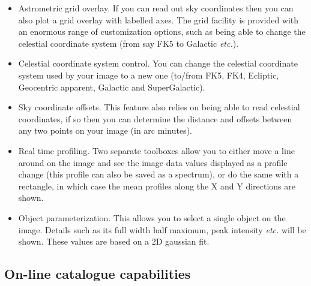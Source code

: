 \documentclass[twoside,11pt]{article}
\newcommand{\xlabel}[1]{}
\renewcommand{\_}{\texttt{\symbol{95}}}
\begin{document}
\begin{itemize}
\item Astrometric grid overlay. If you can read out sky coordinates
  then you can also plot a grid overlay with labelled
  axes. The grid facility is provided with an enormous range of
  customization options, such as being able to change the
  celestial coordinate system (from say FK5 to  Galactic {\em etc.}).

\item Celestial coordinate system control. You can change the celestial
  coordinate system used by your image to a new one (to/from FK5,
  FK4, Ecliptic, Geocentric apparent, Galactic and SuperGalactic).

\item Sky coordinate offsets. This feature also relies on being
  able to read celestial coordinates, if so then you can
  determine the distance and offsets between any two points on
  your image (in arc minutes).

\item Real time profiling. Two separate toolboxes allow you to either
  move a line around on the image and see the image data values
  displayed as a profile change (this profile can also be saved as a
  spectrum), or do the same with a rectangle, in which case the mean
  profiles along the X and Y directions are shown.

\item Object parameterization. This allows you to select a single
  object on the image. Details such as its full width half
  maximum, peak intensity {\em etc.} will be shown. These values are
  based on a 2D gaussian fit.
\end{itemize}

\subsection{\xlabel{online_catalogue_capabilities}On-line catalogue capabilities}
\end{document}
